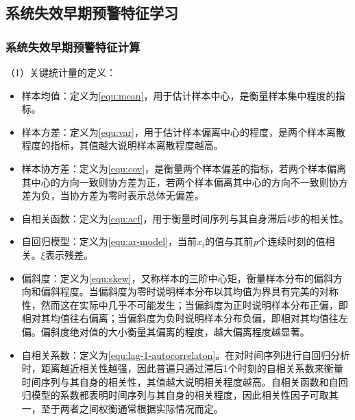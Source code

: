 \subsection{系统失效早期预警特征学习}
\label{sec:csd-early-warning-mining}

\subsubsection{系统失效早期预警特征计算}

（1）关键统计量的定义：
\begin{itemize}
  \item 样本均值：定义为\ref{equ:mean}，用于估计样本中心，是衡量样本集中程度的指标。
  \item 样本方差：定义为\ref{equ:var}，用于估计样本偏离中心的程度，是两个样本离散程度的指标，其值越大说明样本离散程度越高。
  \item 样本协方差：定义为\ref{equ:cov}，是衡量两个样本偏差的指标，若两个样本偏离其中心的方向一致则协方差为正，若两个样本偏离其中心的方向不一致则协方差为负，当协方差为零时表示总体无偏差。
  \item 自相关函数：定义为\ref{equ:acf}，用于衡量时间序列与其自身滞后\emph{k}步的相关性。
  \item 自回归模型：定义为\ref{equ:ar-model}，当前$x_{t}$的值与其前\emph{p}个连续时刻的值相关。$\xi$表示残差。
  \item 偏斜度：定义为\ref{equ:skew}，又称样本的三阶中心矩，衡量样本分布的偏斜方向和偏斜程度。当偏斜度为零时说明样本分布以其均值为界具有完美的对称性，然而这在实际中几乎不可能发生；当偏斜度为正时说明样本分布正偏，即相对其均值往右偏离；当偏斜度为负时说明样本分布负偏，即相对其均值往左偏。偏斜度绝对值的大小衡量其偏离的程度，越大偏离程度越显著。
  \item 自相关系数：定义为\ref{equ:lag-1-autocorrelaton}。在对时间序列进行自回归分析时，距离越近相关性越强，因此普遍只通过滞后1个时刻的自相关系数来衡量时间序列与其自身的相关性，其值越大说明相关程度越高。自相关函数和自回归模型的系数都表明时间序列与其自身的相关程度，因此相关性因子可取其一，至于两者之间权衡通常根据实际情况而定。
\end{itemize}

